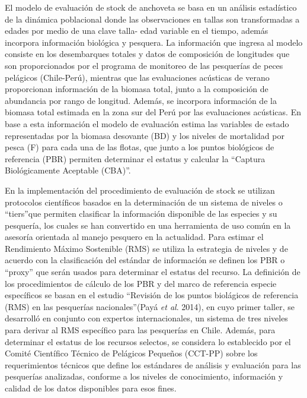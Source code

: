 \documentclass[letter,11pt]{article}
\begin{document}
El modelo de evaluaci\'on de stock de anchoveta se basa en un an\'alisis
estad\'istico de la din\'amica poblacional donde las observaciones en tallas
son transformadas a edades por medio de una clave talla- edad variable
en el tiempo, adem\'as incorpora informaci\'on biol\'ogica y pesquera. La
informaci\'on que ingresa al modelo consiste en los desembarques totales y
datos de composici\'on de longitudes que son proporcionados por el
programa de monitoreo de las pesquer\'ias de peces pel\'agicos (Chile-Per\'u),
mientras que las evaluaciones ac\'usticas de verano proporcionan
informaci\'on de la biomasa total, junto a la composici\'on de abundancia
por rango de longitud. Adem\'as, se incorpora informaci\'on de la biomasa
total estimada en la zona sur del Per\'u por las evaluaciones ac\'usticas.
En base a esta informaci\'on el modelo de evaluaci\'on estima las variables
de estado representadas por la biomasa desovante (BD) y los niveles de
mortalidad por pesca (F) para cada una de las flotas, que junto a los
puntos biol\'ogicos de referencia (PBR) permiten determinar el estatus y
calcular la \textquotedblleft Captura Biol\'ogicamente Aceptable (CBA)\textquotedblright.

En la implementaci\'on del procedimiento de evaluaci\'on de stock se
utilizan protocolos cient\'ificos basados en la determinaci\'on de un
sistema de niveles o \textquotedblleft tiers\textquotedblright que permiten clasificar la informaci\'on
disponible de las especies y su pesquer\'ia, los cuales se han convertido
en una herramienta de uso com\'un en la asesor\'ia orientada al manejo
pesquero en la actualidad. Para estimar el Rendimiento M\'aximo Sostenible
(RMS) se utiliza la estrategia de niveles y de acuerdo con la
clasificaci\'on del est\'andar de informaci\'on se definen los PBR o \textquotedblleft proxy\textquotedblright
que ser\'an usados para determinar el estatus del recurso. La definici\'on
de los procedimientos de c\'alculo de los PBR y del marco de referencia
especie espec\'ificos se basan en el estudio \textquotedblleft Revisi\'on de los puntos
biol\'agicos de referencia (RMS) en las pesquer\'ias nacionales\textquotedblright (Pay\'a
\textit{et al}. 2014), en cuyo primer taller, se desarroll\'o en conjunto
con expertos internacionales, un sistema de tres niveles para derivar al
RMS espec\'ifico para las pesquer\'ias en Chile. Adem\'as, para determinar el
estatus de los recursos selectos, se considera lo establecido por el
Comit\'e Cient\'ifico T\'ecnico de Pel\'agicos Peque\~{n}os (CCT-PP) sobre los
requerimientos t\'ecnicos que define los est\'andares de an\'alisis y
evaluaci\'on para las pesquer\'ias analizadas, conforme a los niveles de
conocimiento, informaci\'on y calidad de los datos disponibles para esos
fines.
\end{document}
